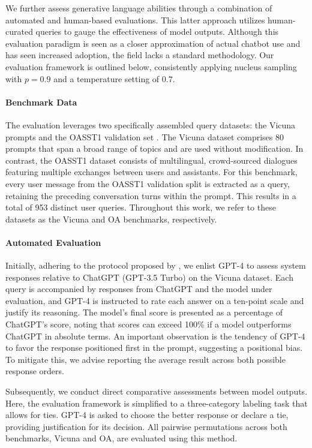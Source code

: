 We further assess generative language abilities through a combination of automated and human-based evaluations. This latter approach utilizes human-curated queries to gauge the effectiveness of model outputs. Although this evaluation paradigm is seen as a closer approximation of actual chatbot use and has seen increased adoption, the field lacks a standard methodology. Our evaluation framework is outlined below, consistently applying nucleus sampling with $p=0.9$ and a temperature setting of $0.7$.

\paragraph{Benchmark Data} The evaluation leverages two specifically assembled query datasets: the Vicuna prompts \citep{vicuna2023} and the OASST1 validation set \citep{kopf2023openassistant}. The Vicuna dataset comprises 80 prompts that span a broad range of topics and are used without modification. In contrast, the OASST1 dataset consists of multilingual, crowd-sourced dialogues featuring multiple exchanges between users and assistants. For this benchmark, every user message from the OASST1 validation split is extracted as a query, retaining the preceding conversation turns within the prompt. This results in a total of 953 distinct user queries. Throughout this work, we refer to these datasets as the Vicuna and OA benchmarks, respectively.

\paragraph{Automated Evaluation} Initially, adhering to the protocol proposed by \citet{vicuna2023}, we enlist GPT-4 to assess system responses relative to ChatGPT (GPT-3.5 Turbo) on the Vicuna dataset. Each query is accompanied by responses from ChatGPT and the model under evaluation, and GPT-4 is instructed to rate each answer on a ten-point scale and justify its reasoning. The model’s final score is presented as a percentage of ChatGPT’s score, noting that scores can exceed 100\% if a model outperforms ChatGPT in absolute terms. An important observation is the tendency of GPT-4 to favor the response positioned first in the prompt, suggesting a positional bias. To mitigate this, we advise reporting the average result across both possible response orders.

Subsequently, we conduct direct comparative assessments between model outputs. Here, the evaluation framework is simplified to a three-category labeling task that allows for ties. GPT-4 is asked to choose the better response or declare a tie, providing justification for its decision. All pairwise permutations across both benchmarks, Vicuna and OA, are evaluated using this method.


